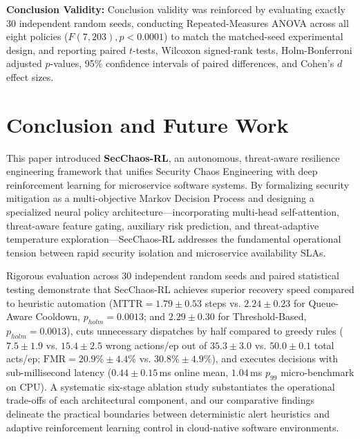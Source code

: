 \documentclass[11pt,a4paper]{article}
\begin{document}
\textbf{Conclusion Validity:} Conclusion validity was reinforced by evaluating exactly 30 independent random seeds, conducting Repeated-Measures ANOVA across all eight policies ($F(7, 203), p < 0.0001$) to match the matched-seed experimental design, and reporting paired $t$-tests, Wilcoxon signed-rank tests, Holm-Bonferroni adjusted $p$-values, 95\% confidence intervals of paired differences, and Cohen's $d$ effect sizes.

\section{Conclusion and Future Work}
\label{sec:conclusion}

This paper introduced \textbf{SecChaos-RL}, an autonomous, threat-aware resilience engineering framework that unifies Security Chaos Engineering with deep reinforcement learning for microservice software systems. By formalizing security mitigation as a multi-objective Markov Decision Process and designing a specialized neural policy architecture—incorporating multi-head self-attention, threat-aware feature gating, auxiliary risk prediction, and threat-adaptive temperature exploration—SecChaos-RL addresses the fundamental operational tension between rapid security isolation and microservice availability SLAs.

Rigorous evaluation across 30 independent random seeds and paired statistical testing demonstrate that SecChaos-RL achieves superior recovery speed compared to heuristic automation ($\text{MTTR} = 1.79 \pm 0.53$ steps vs. $2.24 \pm 0.23$ for Queue-Aware Cooldown, $p_{holm} = 0.0013$; and $2.29 \pm 0.30$ for Threshold-Based, $p_{holm} = 0.0013$), cuts unnecessary dispatches by half compared to greedy rules ($7.5 \pm 1.9$ vs. $15.4 \pm 2.5$ wrong actions/ep out of $35.3 \pm 3.0$ vs. $50.0 \pm 0.1$ total acts/ep; $\text{FMR} = 20.9\% \pm 4.4\%$ vs. $30.8\% \pm 4.9\%$), and executes decisions with sub-millisecond latency ($0.44 \pm 0.15$\,ms online mean, $1.04$\,ms $p_{99}$ micro-benchmark on CPU). A systematic six-stage ablation study substantiates the operational trade-offs of each architectural component, and our comparative findings delineate the practical boundaries between deterministic alert heuristics and adaptive reinforcement learning control in cloud-native software environments.
\end{document}
